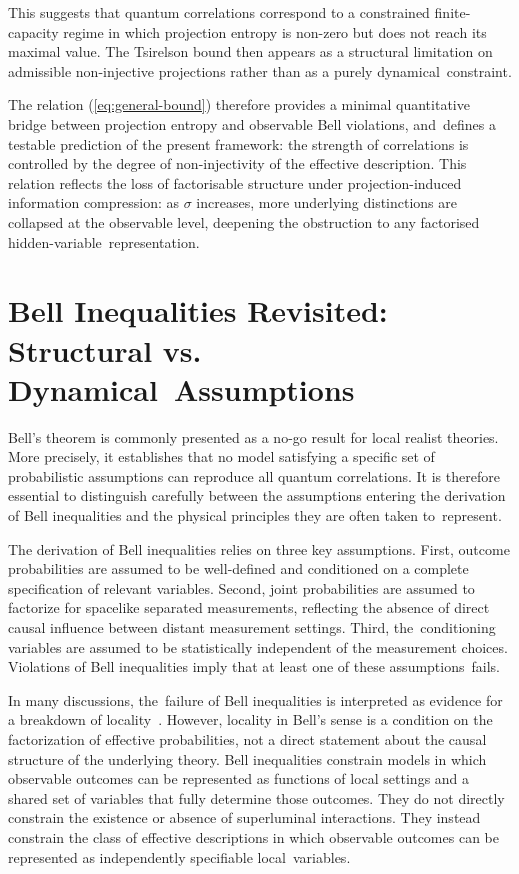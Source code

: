 \documentclass[11pt,a4paper]{article}
\theoremstyle{remark}
\begin{document}
  This suggests that quantum correlations correspond to a constrained finite-capacity
  regime in which projection entropy is non-zero but does not reach its maximal value.
  The Tsirelson bound then appears as a structural limitation on admissible
  non-injective projections rather than as a purely dynamical~constraint.

  The relation (\ref{eq:general-bound}) therefore provides a minimal quantitative bridge
  between projection entropy and observable Bell violations, and~defines a testable
  prediction of the present framework: the strength of correlations is controlled by
  the degree of non-injectivity of the effective description.
  This relation reflects the loss of factorisable structure under
  projection-induced information compression: as $\sigma$ increases, more underlying
  distinctions are collapsed at the observable level, deepening the obstruction to any
  factorised hidden-variable~representation.

  \section{Bell Inequalities Revisited: Structural vs. Dynamical~Assumptions}
  \label{sec:abstract-math-model}

  Bell’s theorem is commonly presented as a no-go result for local realist theories.
  More precisely, it establishes that no model satisfying a specific set of probabilistic
  assumptions can reproduce all quantum correlations.
  It is therefore essential to distinguish carefully between the assumptions entering
  the derivation of Bell inequalities and the physical principles they are often taken to~represent.

  The derivation of Bell inequalities relies on three key assumptions.
  First, outcome probabilities are assumed to be well-defined and conditioned on a
  complete specification of relevant variables.
  Second, joint probabilities are assumed to factorize for spacelike separated
  measurements, reflecting the absence of direct causal influence between distant measurement settings.
  Third, the~conditioning variables are assumed to be statistically independent of the measurement choices.
  Violations of Bell inequalities imply that at least one of these assumptions~fails.

  In many discussions, the~failure of Bell inequalities is interpreted as evidence for a breakdown of
  locality~\cite{Bell1964}.
  However, locality in Bell’s sense is a condition on the factorization of effective
  probabilities, not a direct statement about the causal structure of the underlying
  theory.
  Bell inequalities constrain models in which observable outcomes can be represented
  as functions of local settings and a shared set of variables that fully determine
  those outcomes.
  They do not directly constrain the existence or absence of superluminal interactions.
  They instead constrain the class of effective descriptions in which observable outcomes
  can be represented as independently specifiable local~variables.
\end{document}
